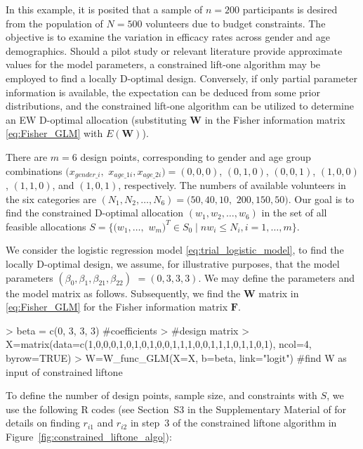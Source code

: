 In this example, it is posited that a sample of $n=200$ participants is desired from the population of $N=500$ volunteers due to budget constraints. The objective is to examine the variation in efficacy rates across gender and age demographics. Should a pilot study or relevant literature provide approximate values for the model parameters, a constrained lift-one algorithm may be employed to find a locally D-optimal design. Conversely, if only partial parameter information is available, the expectation can be deduced from some prior distributions, and the constrained lift-one algorithm can be utilized to determine an EW D-optimal allocation (substituting $\mathbf W$ in the Fisher information matrix \eqref{eq:Fisher_GLM} with $E(\mathbf W)$).

There are $m=6$ design points, corresponding to gender and age group combinations $(x_{gender\_i}, $ $x_{age\_1i}, x_{age\_2i}) = (0,0,0)$, $(0,1,0)$, $(0,0,1)$, $(1,0,0)$, $(1,1,0)$, and $(1,0,1)$, respectively. The numbers of available volunteers in the six categories are $(N_1, N_2, \ldots, N_6) = (50, 40, 10, $ $200, 150, 50)$. Our goal is to find the constrained D-optimal allocation $(w_1, w_2, \dots, w_6)$ in the set of all feasible allocations $S = \{(w_1, \ldots,$ $ w_m)^T \in S_0 \mid n w_i \leq N_i, i=1, \ldots, m\}$.

We consider the logistic regression model \eqref{eq:trial_logistic_model}, to find the locally D-optimal design, we assume, for illustrative purposes, that the model parameters $(\beta_0, \beta_{1}, \beta_{21}, \beta_{22})$ $=(0,3,3,3)$. We may define the parameters and the model matrix as follows. Subsequently, we find the $\mathbf W$ matrix in \eqref{eq:Fisher_GLM} for the Fisher information matrix $\mathbf F$.

\begin{example}
  > beta = c(0, 3, 3, 3) #coefficients
  > #design matrix
  > X=matrix(data=c(1,0,0,0,1,0,1,0,1,0,0,1,1,1,0,0,1,1,1,0,1,1,0,1), ncol=4, byrow=TRUE)
  > W=W_func_GLM(X=X, b=beta, link="logit") #find W as input of constrained liftone
\end{example}
To define the number of design points, sample size, and constraints with $S$, we use the following R codes (see Section~S3 in the Supplementary Material of \cite{huang2023constrained} for details on finding $r_{i1}$ and $r_{i2}$ in step~3 of the constrained liftone algorithm in Figure~\ref{fig:constrained_liftone_algo}):

